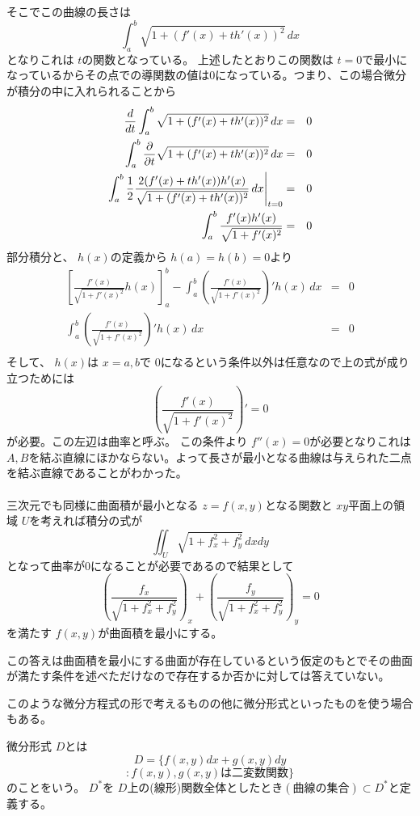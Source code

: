 \documentclass[dvipdfmx]{jsarticle}
\begin{document}
\begin{multicols}{2}
    そこでこの曲線の長さは
    \[
    \int_a^b \sqrt{1 + (f'(x) + th'(x))^2} \, dx
    \]
    となりこれは $t$の関数となっている。
    上述したとおりこの関数は $t = 0$で最小になっているからその点での導関数の値は0になっている。つまり、この場合微分が積分の中に入れられることから
    \begin{eqnarray*}
      \frac{d}{dt}\int_a^b \sqrt{1 + (f'(x) + th'(x))^2} \, dx & = & 0 \\
      \int_a^b \frac{\partial }{\partial t} \sqrt{1 + (f'(x) + th'(x))^2} \, dx & = & 0 \\
      \left. \int_a^b \frac{1}{2} \frac{2(f'(x) + th'(x))h'(x)}{\sqrt{1 + (f'(x) + th'(x))^2}} \, dx \right|_{t = 0} & = & 0 \\
      \int_a^b \frac{f'(x) h'(x)}{\sqrt{1 + f'(x)^2}} & = & 0
    \end{eqnarray*}
    部分積分と、 $h(x)$の定義から $h(a) = h(b) = 0$より
    \begin{eqnarray*}
      \left[ \frac{f'(x)}{\sqrt{1 + f'(x)^2}} h(x) \right]_a^b - \int_a^b \left( \frac{f'(x)}{\sqrt{1 + f'(x)^2}} \right)' h(x) \, dx & = & 0 \\
      \int_a^b \left( \frac{f'(x)}{\sqrt{1 + f'(x)^2}} \right)' h(x) \, dx & = & 0 \\
    \end{eqnarray*}
    そして、 $h(x)$は $x = a,b$で $0$になるという条件以外は任意なので上の式が成り立つためには
    \[
    \left( \frac{f'(x)}{\sqrt{1 + f'(x)^2}} \right)' = 0
    \]
    が必要。この左辺は曲率と呼ぶ。
    この条件より $f''(x) = 0$が必要となりこれは $A,B$を結ぶ直線にほかならない。よって長さが最小となる曲線は与えられた二点を結ぶ直線であることがわかった。
    \\
    \\
    三次元でも同様に曲面積が最小となる $z = f(x,y)$となる関数と $xy$平面上の領域 $U$を考えれば積分の式が
    \[
    \iint_U \sqrt{1 + f_x^2 + f_y^2} \, dxdy
    \]
    となって曲率が0になることが必要であるので結果として
    \[
    \left( \frac{f_x}{\sqrt{1 + f_x^2 + f_y^2}} \right)_x + \left( \frac{f_y}{\sqrt{1 + f_x^2 + f_y^2}} \right)_y = 0
    \]
    を満たす $f(x,y)$が曲面積を最小にする。

    この答えは曲面積を最小にする曲面が存在しているという仮定のもとでその曲面が満たす条件を述べただけなので存在するか否かに対しては答えていない。

    このような微分方程式の形で考えるものの他に微分形式といったものを使う場合もある。

    微分形式 $D$とは
    \[
    D = \{ f(x,y)dx + g(x,y)dy
    \]
    \[
     : f(x,y) , g(x,y)は二変数関数 \}
    \]
    のことをいう。
    $D^*$を $D$上の(線形)関数全体としたとき$(曲線の集合) \subset D^*$と定義する。


\end{multicols}
\end{document}
